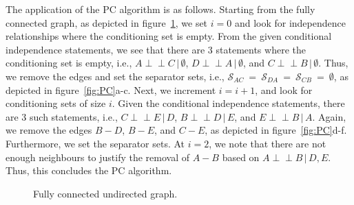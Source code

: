 \documentclass{article}
\newcommand{\giv}{\,|\,}
\newcommand{\indep}{\perp \!\!\! \perp}
\begin{document}
\noindent The application of the PC algorithm is as follows. Starting from the fully connected graph, as depicted in figure~\ref{fig:PC1}, we set $i = 0$ and look for independence relationships where the conditioning set is empty. From the given conditional independence statements, we see that there are 3 statements where the conditioning set is empty, i.e., $A \indep C \giv \emptyset$, $D \indep A \giv \emptyset$, and $C \indep B \giv \emptyset$. Thus, we remove the edges and set the separator sets, i.e., $\mathcal{S}_{AC}~=~\mathcal{S}_{DA}~=~\mathcal{S}_{CB}~=~\emptyset$, as depicted in figure~\ref{fig:PC}a-c. Next, we increment $i = i + 1$, and look for conditioning sets of size $i$. Given the conditional independence statements, there are 3 such statements, i.e., $C \indep E \giv D$, $B \indep D \giv E$, and $E \indep B \giv A$. Again, we remove the edges $B - D$, $B - E$, and $C - E$, as depicted in figure~\ref{fig:PC}d-f. Furthermore, we set the separator sets. At $i = 2$, we note that there are not enough neighbours to justify the removal of $A - B$ based on $A \indep B \giv D, E$. Thus, this concludes the PC algorithm. 

\begin{figure}[t]
    \centering
    \caption{Fully connected undirected graph. }
    \label{fig:PC1}
\end{figure}
\end{document}
